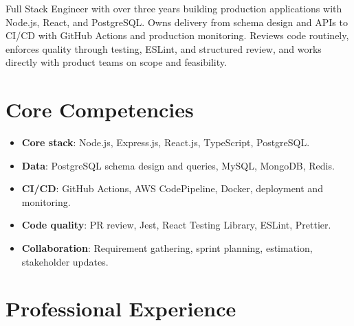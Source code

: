 \documentclass[11pt,a4paper,sans]{moderncv}
\begin{document}
\makecvtitle

\vspace{6pt}
{\small Full Stack Engineer with over three years building production applications with Node.js, React, and PostgreSQL. Owns delivery from schema design and APIs to CI/CD with GitHub Actions and production monitoring. Reviews code routinely, enforces quality through testing, ESLint, and structured review, and works directly with product teams on scope and feasibility.\par}

\section{Core Competencies}
\vspace{1pt}
\begin{itemize}

\item \textbf{Core stack}: Node.js, Express.js, React.js, TypeScript, PostgreSQL.

\item \textbf{Data}: PostgreSQL schema design and queries, MySQL, MongoDB, Redis.

\item \textbf{CI/CD}: GitHub Actions, AWS CodePipeline, Docker, deployment and monitoring.

\item \textbf{Code quality}: PR review, Jest, React Testing Library, ESLint, Prettier.

\item \textbf{Collaboration}: Requirement gathering, sprint planning, estimation, stakeholder updates.

\end{itemize}

\section{Professional Experience}
\vspace{3pt}
\end{document}
